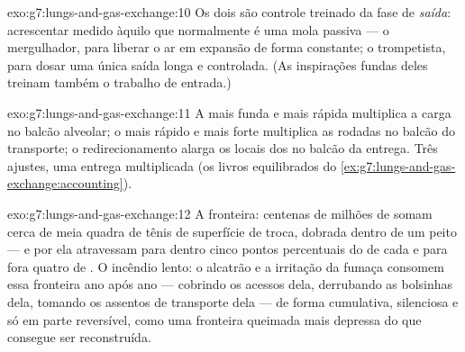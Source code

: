 \begin{solution}{exo:g7:lungs-and-gas-exchange:10}
Os dois são controle treinado da fase de \emph{saída}: acrescentar
 medido àquilo que normalmente é uma mola passiva --- o
mergulhador, para liberar o ar em expansão de forma constante; o
trompetista, para dosar uma única saída longa e controlada. (As
inspirações fundas deles treinam também o trabalho de entrada.)
\end{solution}

\begin{solution}{exo:g7:lungs-and-gas-exchange:11}
A  mais funda e mais rápida multiplica a carga no balcão
alveolar; o  mais rápido e mais forte multiplica as rodadas no
balcão do transporte; o redirecionamento alarga os  locais dos
 no balcão da entrega. Três ajustes, uma entrega multiplicada
(os livros equilibrados do
\cref{ex:g7:lungs-and-gas-exchange:accounting}).
\end{solution}

\begin{solution}{exo:g7:lungs-and-gas-exchange:12}
A fronteira: centenas de milhões de  somam cerca de meia
quadra de tênis de superfície de troca, dobrada dentro de um peito ---
e por ela atravessam para dentro cinco pontos percentuais do 
de cada  e para fora quatro de . O incêndio
lento: o alcatrão e a irritação da fumaça consomem essa fronteira ano
após ano --- cobrindo os acessos dela, derrubando as bolsinhas dela,
tomando os assentos de transporte dela --- de forma cumulativa,
silenciosa e só em parte reversível, como uma fronteira queimada mais
depressa do que consegue ser reconstruída.
\end{solution}

